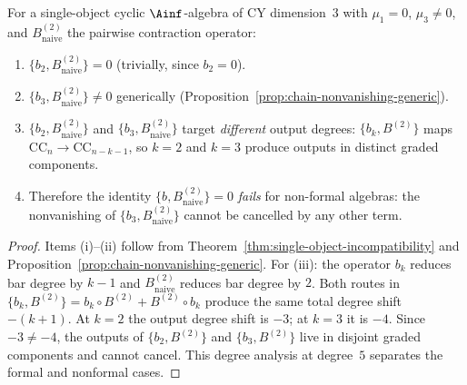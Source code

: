 \begin{corollary}
\label{cor:no-naive-cross-degree}
For a single-object cyclic $\Ainf$-algebra of CY dimension~$3$
with $\mu_1 = 0$, $\mu_3 \neq 0$, and $B^{(2)}_{\mathrm{naive}}$
the pairwise contraction operator:
\begin{enumerate}[label=\textup{(\roman*)}]
 \item $\{b_2, B^{(2)}_{\mathrm{naive}}\} = 0$ (trivially, since
 $b_2 = 0$).
 \item $\{b_3, B^{(2)}_{\mathrm{naive}}\} \neq 0$ generically
 (Proposition~\ref{prop:chain-nonvanishing-generic}).
 \item $\{b_2, B^{(2)}_{\mathrm{naive}}\}$ and
 $\{b_3, B^{(2)}_{\mathrm{naive}}\}$ target \emph{different}
 output degrees: $\{b_k, B^{(2)}\}$ maps
 $\mathrm{CC}_n \to \mathrm{CC}_{n-k-1}$, so $k = 2$ and
 $k = 3$ produce outputs in distinct graded components.
 \item Therefore the identity
 $\{b, B^{(2)}_{\mathrm{naive}}\} = 0$ \emph{fails} for
 non-formal algebras: the nonvanishing of $\{b_3, B^{(2)}_{\mathrm{naive}}\}$
 cannot be cancelled by any other term.
\end{enumerate}
\end{corollary}

\begin{proof}
Items (i)--(ii) follow from
Theorem~\ref{thm:single-object-incompatibility} and
Proposition~\ref{prop:chain-nonvanishing-generic}. For (iii):
the operator $b_k$ reduces bar degree by $k - 1$ and
$B^{(2)}_{\mathrm{naive}}$ reduces bar degree by $2$. Both
routes in $\{b_k, B^{(2)}\} = b_k \circ B^{(2)} + B^{(2)} \circ b_k$
produce the same total degree shift $-(k + 1)$. At $k = 2$ the
output degree shift is $-3$; at $k = 3$ it is $-4$. Since
$-3 \neq -4$, the outputs of $\{b_2, B^{(2)}\}$ and
$\{b_3, B^{(2)}\}$ live in disjoint graded components and
cannot cancel.
This degree analysis at degree~$5$ separates the formal and nonformal
cases.
\end{proof}

